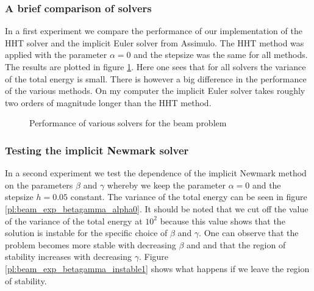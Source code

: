 \documentclass{report}
\newcounter{constant}
\begin{document}
\subsubsection*{A brief comparison of solvers}

In a first experiment we compare the performance of our implementation of the HHT solver and the implicit Euler solver from Assimulo. The HHT method was applied with the parameter $\alpha=0$ and the stepsize was the same for all methods. The results are plotted in figure \ref{tb:beam_exp_solverComparison}. Here one sees that for all solvers the variance of the total energy is small. There is however a big difference in the performance of the various methods. On my computer the implicit Euler solver takes roughly two orders of magnitude longer than the HHT method.

\begin{figure}[h]
\centering

\caption{Performance of various solvers for the beam problem}
\label{tb:beam_exp_solverComparison}
\end{figure}


\subsubsection*{Testing the implicit Newmark solver}

In a second experiment we test the dependence of the implicit Newmark method on the parameters $\beta$ and $\gamma$ whereby we keep the parameter $\alpha=0$ and the stepsize $h=0.05$ constant. The variance of the total energy can be seen in figure \ref{pl:beam_exp_betagamma_alpha0}. It should be noted that we cut off the value of the variance of the total energy at $10^2$ because this value shows that the solution is instable for the specific choice of $\beta$ and $\gamma$. One can observe that the problem becomes more stable with decreasing $\beta$ and and that the region of stability increases with decreasing $\gamma$. Figure \ref{pl:beam_exp_betagamma_instable1} shows what happens if we leave the region of stability.
\end{document}
